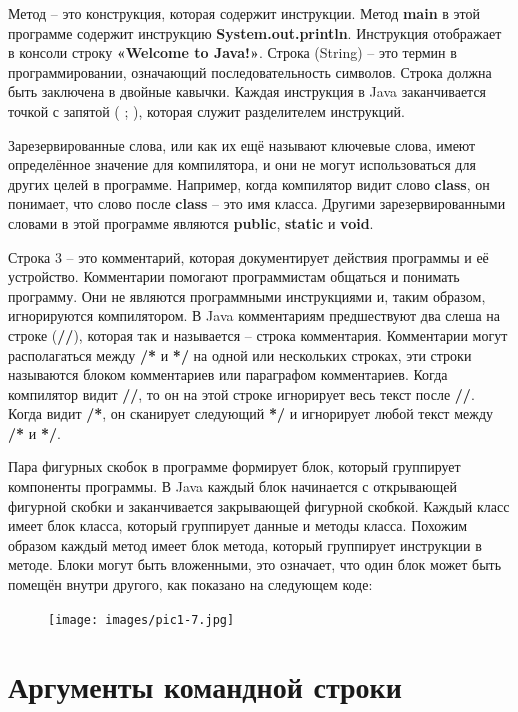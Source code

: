 Метод – это конструкция, которая содержит инструкции. Метод \textbf{main} в этой программе содержит инструкцию \textbf{System.out.println}. Инструкция отображает в консоли строку \textbf{«Welcome to Java!»}. Строка (String) – это термин в программировании, означающий последовательность символов. Строка должна быть заключена в двойные кавычки. Каждая инструкция в Java заканчивается точкой с запятой ( ; ), которая служит разделителем инструкций.

Зарезервированные слова, или как их ещё называют ключевые слова, имеют определённое значение для компилятора, и они не могут использоваться для других целей в программе. Например, когда компилятор видит слово \textbf{class}, он понимает, что слово после \textbf{class} – это имя класса. Другими зарезервированными словами в этой программе являются \textbf{public}, \textbf{static} и \textbf{void}.

Строка 3 – это комментарий, которая документирует действия программы и её устройство. Комментарии помогают программистам общаться и понимать программу. Они не являются программными инструкциями и, таким образом, игнорируются компилятором. В Java комментариям предшествуют два слеша на строке (\textbf{//}), которая так и называется – строка комментария. Комментарии могут располагаться между \textbf{/*} и \textbf{*/} на одной или нескольких строках, эти строки называются блоком комментариев или параграфом комментариев. Когда компилятор видит \textbf{//}, то он на этой строке игнорирует весь текст после \textbf{//}. Когда видит \textbf{/*}, он сканирует следующий \textbf{*/} и игнорирует любой текст между \textbf{/*} и \textbf{*/}.

Пара фигурных скобок в программе формирует блок, который группирует компоненты программы. В Java каждый блок начинается с открывающей фигурной скобки и заканчивается закрывающей фигурной скобкой. Каждый класс имеет блок класса, который группирует данные и методы класса. Похожим образом каждый метод имеет блок метода, который группирует инструкции в методе. Блоки могут быть вложенными, это означает, что один блок может быть помещён внутри другого, как показано на следующем коде:
\begin{figure}[h!]\center
  \texttt{[image: images/pic1-7.jpg]}
\end{figure}

\section{Аргументы командной строки}

